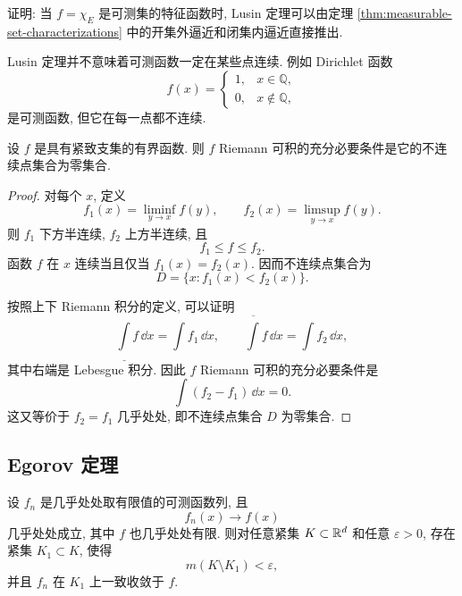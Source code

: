 \begin{exer}\label{exer:lusin-for-characteristic}
	证明: 当 \(f=\chi_E\) 是可测集的特征函数时, Lusin 定理可以由定理 \ref{thm:measurable-set-characterizations} 中的开集外逼近和闭集内逼近直接推出.
\end{exer}

\begin{rem}
	Lusin 定理并不意味着可测函数一定在某些点连续. 例如 Dirichlet 函数
	\[
	f(x)=
	\begin{cases}
		1, & x\in\mathbb Q,\\
		0, & x\notin\mathbb Q,
	\end{cases}
	\]
	是可测函数, 但它在每一点都不连续.
\end{rem}

\begin{thm}
	\label{thm:riemann-integrable-iff-discontinuities-null}
	设 \(f\) 是具有紧致支集的有界函数. 则 \(f\) Riemann 可积的充分必要条件是它的不连续点集合为零集合.
\end{thm}

\begin{proof}
	对每个 \(x\), 定义
	\[
	f_1(x)=\liminf_{y\to x}f(y),
	\qquad
	f_2(x)=\limsup_{y\to x}f(y).
	\]
	则 \(f_1\) 下方半连续, \(f_2\) 上方半连续, 且
	\[
	f_1\leq f\leq f_2.
	\]
	函数 \(f\) 在 \(x\) 连续当且仅当 \(f_1(x)=f_2(x)\). 因而不连续点集合为
	\[
	D=\{x:f_1(x)<f_2(x)\}.
	\]
	
	按照上下 Riemann 积分的定义, 可以证明
	\[
	\underline{\int} f\,\dd x=\int f_1\,\dd x,
	\qquad
	\overline{\int} f\,\dd x=\int f_2\,\dd x,
	\]
	其中右端是 Lebesgue 积分. 因此 \(f\) Riemann 可积的充分必要条件是
	\[
	\int (f_2-f_1)\,\dd x=0.
	\]
	这又等价于 \(f_2=f_1\) 几乎处处, 即不连续点集合 \(D\) 为零集合.
\end{proof}

\subsection{Egorov 定理}

\begin{thm}[Egorov 定理]
	\label{thm:egorov}
	设 \(f_n\) 是几乎处处取有限值的可测函数列, 且
	\[
	f_n(x)\to f(x)
	\]
	几乎处处成立, 其中 \(f\) 也几乎处处有限. 则对任意紧集 \(K\subset\mathbb{R}^d\) 和任意 \(\varepsilon>0\), 存在紧集 \(K_1\subset K\), 使得
	\[
	m(K\setminus K_1)<\varepsilon,
	\]
	并且 \(f_n\) 在 \(K_1\) 上一致收敛于 \(f\).
\end{thm}

